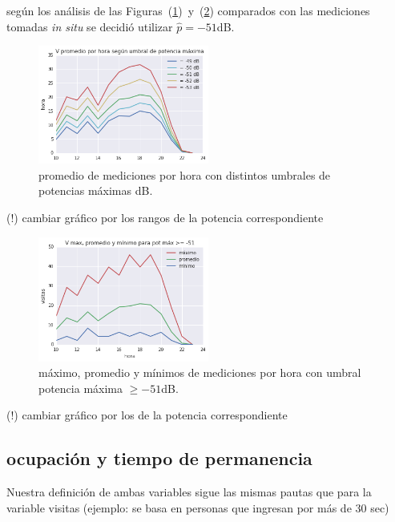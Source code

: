 según los análisis de las Figuras~(\ref{fig:p_49-53})~y~(\ref{fig:p_51})
comparados con las mediciones tomadas \textit{in situ}
se decidió utilizar $\hat{p} = -51$dB.
\begin{figure}[H] 
  \centering
  \includegraphics[width=0.5\textwidth]{p_49-53.png}
  \caption{
    promedio de mediciones por hora con distintos umbrales de potencias máximas dB.
  }
  \label{fig:p_49-53}
\end{figure}

(!) cambiar gráfico por los rangos de la potencia correspondiente


\begin{figure}[H] 
  \centering
  \includegraphics[width=0.5\textwidth]{p_51.png}
  \caption{
    máximo, promedio y mí­nimos de mediciones por hora con umbral potencia máxima $\ge -51$dB.
  }
  \label{fig:p_51}
\end{figure}

(!) cambiar gráfico por los de la potencia correspondiente

\subsection{ocupación y tiempo de permanencia}
Nuestra definición de ambas variables
sigue las mismas pautas que para la variable visitas (ejemplo: se basa en personas que ingresan por más de 30 sec) 

